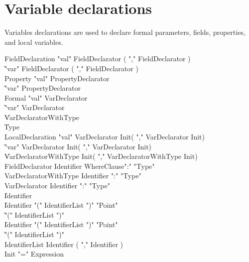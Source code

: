 \chapter{Variable declarations}
\label{exploded-syntax}

Variables declarations are used to declare formal parameters,
fields, properties, and local variables.

\begin{grammar}
FieldDeclaration
        \: \xcd"val" FieldDeclarator ( \xcd"," FieldDeclarator )\star \\
        \| \xcd"var" FieldDeclarator ( \xcd"," FieldDeclarator )\star \\
Property
        \: \xcd"val" PropertyDeclarator \\
        \| \xcd"var" PropertyDeclarator \\
Formal
        \: \xcd"val" VarDeclarator \\
        \| \xcd"var" VarDeclarator \\
        \| VarDeclaratorWithType \\
        \| Type \\
LocalDeclaration
        \: \xcd"val" VarDeclarator Init\opt ( \xcd"," VarDeclarator Init\opt )\star \\
        \| \xcd"var" VarDeclarator Init\opt ( \xcd"," VarDeclarator Init\opt )\star \\
        \| VarDeclaratorWithType Init\opt ( \xcd"," VarDeclaratorWithType Init\opt )\star \\
FieldDeclarator \: Identifier WhereClause\opt \xcd":" \xcd"Type" \\
VarDeclaratorWithType \: Identifier \xcd":" \xcd"Type" \\
VarDeclarator \: Identifier \xcd":" \xcd"Type" \\
              \| Identifier \\
              \| Identifier \xcd"(" IdentifierList \xcd")" \xcd"Point" \\
              \| \xcd"(" IdentifierList \xcd")" \\
              \| Identifier \xcd"(" IdentifierList \xcd")" \xcd"Point" \\
              \| \xcd"(" IdentifierList \xcd")" \\
IdentifierList \: Identifier ( \xcd"," Identifier )\star \\
Init \: \xcd"=" Expression \\
\end{grammar}

